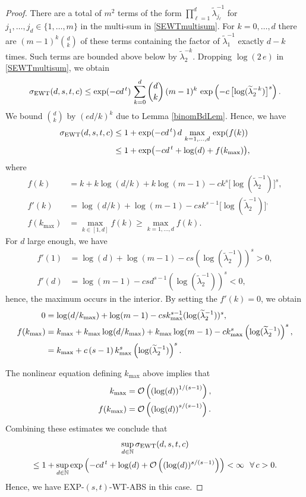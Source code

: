 \documentclass[graybox]{svmult}
\newcommand{\tlambda}{\widetilde{\lambda}}
\newcommand{\naturals}{\mathbb{N}}
\newcommand{\SEWT}{\sigma_{\textup{EWT}}}
\newcommand{\EXP}{\textup{EXP}\xspace}
\newcommand{\ABS}{\textup{ABS}\xspace}
\newcommand{\WT}{\textup{WT}\xspace}
\begin{document}
\begin{proof}
There are a total of $m^2$ terms of the form $\prod_{\ell = 1}^d \tlambda_{j_\ell}^{-1}$ for $j_1, \ldots, j_d \in \{1, \ldots, m\}$ in the multi-sum in \eqref{SEWTmultisum}.  For $k = 0, \ldots, d$ there are $(m-1)^k\binom{d}{k}$ of these terms containing the factor of $\tlambda_1^{-1}$ exactly $d-k$ times.  Such terms are bounded above below by $\tlambda_2^{-k}$. Dropping $\log(2\,e)$ in \eqref{SEWTmultisum}, we obtain
$$
\SEWT(d,s,t,c ) \le \exp(-cd^{\,t})\,\sum_{k=0}^d\binom{d}{k}
\,(m-1)^k\,\exp\left(-c\,\bigl[\log(\tlambda_{2}^{-k})\bigr]^s\right).
$$
We bound
$\binom{d}{k}$ by $(ed/k)^k$ due to Lemma \ref{binomBdLem}. Hence, we have
\begin{align*}
\SEWT(d,s,t,c) & \le 1 + \exp(-cd^{\,t})\,  d\,
\max_{k=1,\dots,d}\,\exp(f(k)) \\
& \le 1 +  \exp\bigl(-cd^{\,t} + \log(d) + f(k_{\max})\bigr),
\end{align*}
where
\begin{align*}
f(k)&=k+k\log(d/k)+k\log(m-1)-ck^s\bigl[\log(\tlambda_2^{-1})\bigr]^s, \\
f'(k)&= \log(d/k)+ \log(m-1)- c s k^{s-1}\bigl[\log(\tlambda_2^{-1})\bigr]^, \\
f(k_{\max})& = \max_{k\in[1,d]}f(k)  \ge \max_{k=1,\dots,d}f(k).
\end{align*}
For $d$ large enough, we have
\begin{align*}
f'(1)&= \log(d) +\log(m-1)- c s(\log(\tlambda_2^{-1}))^s > 0,\\
f'(d)&= \log(m-1)-c s d^{s-1}(\log(\tlambda_2^{-1}))^s < 0,
\end{align*}
hence,
the maximum occurs in the interior.  By setting the $f'(k)=0$, we obtain
\begin{align*}
0  & = \log(d/k_{\rm max}) + \log(m-1)-
csk_{\rm max}^{s-1}(\log(\tlambda_2^{-1}))^s, \\
f(k_{\rm max})&=k_{\rm max}+k_{\rm max}\log(d/k_{\rm max})
+k_{\rm max}\log(m-1)-ck_{\rm
        max}^{s}\left(\log(\tlambda_2^{-1})\right)^s,\\
&= k_{\rm max}+c\,(s-1)\,k_{\rm
        max}^{s}\left(\log(\tlambda_2^{-1})\right)^s.
\end{align*}

The nonlinear equation defining $k_{\max}$ above implies that
\begin{align*}
k_{\rm max} &=
\mathcal{O}\left(\left(\log(d)\right)^{1/(s-1)}\right),\\
f(k_{\rm max})&=
\mathcal{O}\left( \left(\log(d)\right)^{s/(s-1)}\right).
\end{align*}
Combining these estimates we conclude that
\begin{multline*}
\sup_{d\in \naturals}\SEWT(d,s,t,c )
\\
\le 1 + \sup_{d\in\naturals}
\exp\left(-cd^{\,t}+\log(d)+ \mathcal{O}\left((\log(d))^{s/(s-1)}\right)   \right)<\infty \
\ \forall\,c>0.
\end{multline*}
Hence, we have \EXP-$(s,t)$-\WT-\ABS in this case.


\end{proof}
\end{document}

